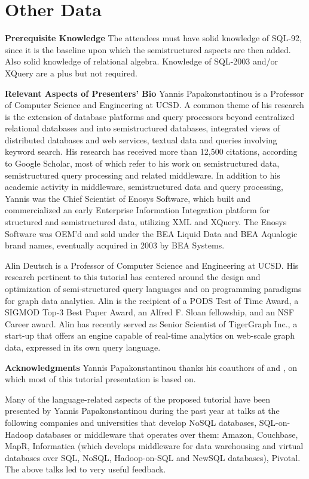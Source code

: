 

\section{Other Data}
\label{sec:duration}

\noindent \textbf{Prerequisite Knowledge} 
\label{sec:audience}
The attendees must have solid knowledge of SQL-92, since it is the baseline upon which the semistructured aspects are then added. Also solid knowledge of relational algebra. Knowledge of SQL-2003 and/or XQuery are a plus but not required.

\noindent \textbf{Relevant Aspects of Presenters' Bio} 
Yannis Papakonstantinou is a Professor of Computer Science and Engineering at UCSD. A common theme of his research is the extension of database platforms and query processors beyond centralized relational databases and into semistructured databases, integrated views of distributed databases and web services, textual data and queries involving keyword search. His research has received more than 12,500 citations, according to Google Scholar, most of which refer to his work on semistructured data, semistructured query processing and related middleware.
In addition to his academic activity in middleware, semistructured data and query processing, Yannis was the Chief Scientist of Enosys Software, which built and commercialized an early Enterprise Information Integration platform for structured and semistructured data, utilizing XML and XQuery. The Enosys Software was OEM'd and sold under the BEA Liquid Data and BEA Aqualogic brand names, eventually acquired in 2003 by BEA Systems.

Alin Deutsch is a Professor of Computer Science and Engineering at UCSD. His research pertinent to this tutorial has centered around the design and optimization of semi-structured query languages
and on programming paradigms for graph data analytics. Alin is the recipient of a PODS Test of Time Award, a SIGMOD Top-3 Best Paper Award, an Alfred F. Sloan fellowship, and an NSF Career award.
Alin has recently served as Senior Scientist of TigerGraph Inc., a start-up that offers an engine capable of real-time analytics on web-scale graph data, expressed in its own query language.


\noindent \textbf{Acknowledgments} 
Yannis Papakonstantinou thanks his coauthors of \cite{sqlpp-extended-corr-2015} and \cite{sqlpp-survey-2015}, on which most of this tutorial presentation is based on.

Many of the language-related aspects of the proposed tutorial have been presented by Yannis Papakonstantinou during the past year at talks at the following companies and universities that develop NoSQL databases,  SQL-on-Hadoop databases or middleware that operates over them: Amazon, Couchbase, MapR, Informatica (which develops middleware for data warehousing and virtual databases over SQL, NoSQL, Hadoop-on-SQL and NewSQL databases), Pivotal. The above talks led to very useful feedback.
